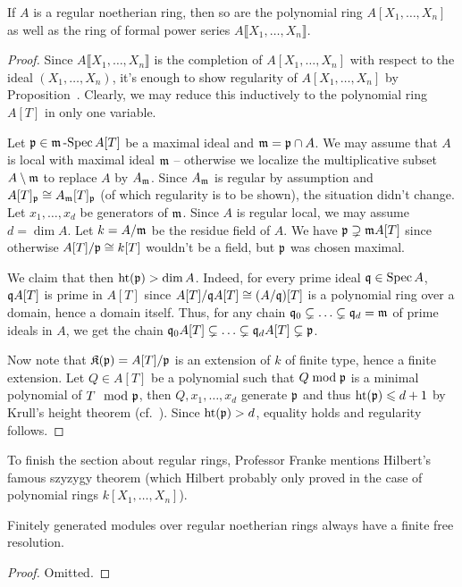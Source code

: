 \documentclass[a4paper,parskip=half,numbers=enddot, DIV=12]{scrreprt}
\renewcommand{\geq}{\geqslant}
\renewcommand{\leq}{\leqslant}
\begin{document}
\begin{prop}
	If $A$ is a regular noetherian ring, then so are the polynomial ring $A[X_1,\ldots,X_n]$ as well as the ring of formal power series $A\llbracket X_1,\ldots,X_n\rrbracket$.
\end{prop}
\begin{proof}
	Since $A\llbracket X_1,\ldots,X_n\rrbracket$ is the completion of $A[X_1,\ldots,X_n]$ with respect to the ideal $(X_1,\ldots,X_n)$, it's enough to show regularity of $A[X_1,\ldots,X_n]$ by Proposition~. Clearly, we may reduce this inductively to the polynomial ring $A[T]$ in only one variable. 
	
	Let $\mathfrak{p}\in\mathfrak{m}\operatorname{-Spec} A[T]$ be a maximal ideal and $\mathfrak{m}=\mathfrak{p}\cap A$. We may assume that $A$ is local with maximal ideal $\mathfrak{m}$ -- otherwise we localize the multiplicative subset $A\setminus \mathfrak{m}$ to replace $A$ by $A_{\mathfrak{m}}$. Since $A_{\mathfrak{m}}$ is regular by assumption and $A[T]_{\mathfrak{p}}\cong A_{\mathfrak{m}}[T]_{\mathfrak{p}}$ (of which regularity is to be shown), the situation didn't change. Let $x_1,\ldots,x_d$ be generators of $\mathfrak{m}$. Since $A$ is regular local, we may assume $d=\dim A$. Let $k=A/\mathfrak{m}$ be the residue field of $A$. We have $\mathfrak{p}\supsetneq \mathfrak{m} A[T]$ since otherwise $A[T]/\mathfrak{p}\cong k[T]$ wouldn't be a field, but $\mathfrak{p}$ was chosen maximal. %
	
	We claim that then $\operatorname{ht}(\mathfrak{p})>\dim A$. Indeed, for every prime ideal $\mathfrak{q}\in\operatorname{Spec} A$, $\mathfrak{q} A[T]$ is prime in $A[T]$ since $A[T]/\mathfrak{q} A[T]\cong (A/\mathfrak{q})[T]$ is a polynomial ring over a domain, hence a domain itself. Thus, for any chain $\mathfrak{q}_0\subsetneq \ldots\subsetneq \mathfrak{q}_d=\mathfrak{m}$ of prime ideals in $A$, we get the chain $\mathfrak{q}_0 A[T]\subsetneq \ldots\subsetneq \mathfrak{q}_d A[T]\subsetneq \mathfrak{p}$.
	
	Now note that $\mathfrak{K}(\mathfrak{p})=A[T]/\mathfrak{p}$ is an extension of $k$ of finite type, hence a finite extension. Let $Q\in A[T]$ be a polynomial such that $Q\bmod \mathfrak{p}$ is a minimal polynomial of $T\mod{\mathfrak{p}}$, then $Q,x_1,\ldots,x_d$ generate $\mathfrak{p}$ and thus $\hoehe(\pp)\leq d+1$ by Krull's height theorem (cf.\ \cite[Theorem~12]{alg2}). Since $\operatorname{ht}(\mathfrak{p})>d$, equality holds and regularity follows.
\end{proof}
To finish the section about regular rings, Professor Franke mentions Hilbert's famous szyzygy theorem (which Hilbert probably only proved in the case of polynomial rings $k[X_1,\ldots,X_n]$).
\begin{prop}
	Finitely generated modules over regular noetherian rings always have a finite free resolution.
\end{prop}
\begin{proof}
	Omitted.
\end{proof}
\end{document}
